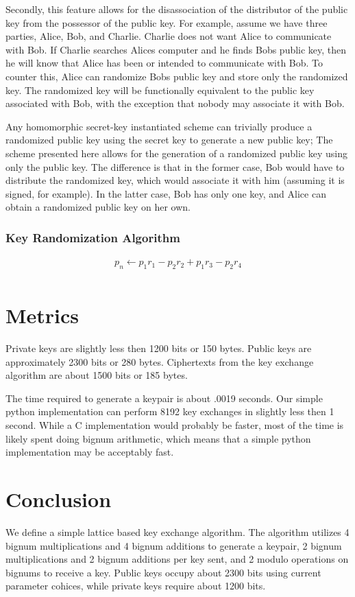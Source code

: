\documentclass[preprint]{iacrtrans}
\begin{document}
Secondly, this feature allows for the disassociation of the distributor of the public key from the possessor of the public key. For example, assume we have three parties, Alice, Bob, and Charlie. Charlie does not want Alice to communicate with Bob. If Charlie searches Alices computer and he finds Bobs public key, then he will know that Alice has been or intended to communicate with Bob. To counter this, Alice can randomize Bobs public key and store only the randomized key. The randomized key will be functionally equivalent to the public key associated with Bob, with the exception that nobody may associate it with Bob. 

Any homomorphic secret-key instantiated scheme can trivially produce a randomized public key using the secret key to generate a new public key; The scheme presented here allows for the generation of a randomized public key using only the public key. The difference is that in the former case, Bob would have to distribute the randomized key, which would associate it with him (assuming it is signed, for example). In the latter case, Bob has only one key, and Alice can obtain a randomized public key on her own.

\subsubsection{Key Randomization Algorithm}
\begin{align}
    p_n \gets p_1 r_1 - p_2 r_2 + p_1 r_3 - p_2 r_4\\
\end{align}

\section{Metrics}
Private keys are slightly less then 1200 bits or 150 bytes. Public keys are approximately 2300 bits or 280 bytes. Ciphertexts from the key exchange algorithm are about 1500 bits or 185 bytes.

The time required to generate a keypair is about .0019 seconds. Our simple python implementation can perform 8192 key exchanges in slightly less then 1 second. While a C implementation would probably be faster, most of the time is likely spent doing bignum arithmetic, which means that a simple python implementation may be acceptably fast.

\section{Conclusion}
 We define a simple lattice based key exchange algorithm. The algorithm utilizes 4 bignum multiplications and 4 bignum additions to generate a keypair, 2 bignum multiplications and 2 bignum additions per key sent, and 2 modulo operations on bignums to receive a key. Public keys occupy about 2300 bits using current parameter cohices, while private keys require about 1200 bits.
\end{document}

